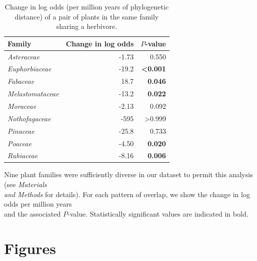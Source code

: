 \documentclass[12pt]{article}
\begin{document}
  \begin{table}[!h]
  \caption{\small Change in log odds (per million years of phylogenetic distance) of a pair of plants in the same family sharing a herbivore.}
  \label{family_slopes_ph}
  \begin{tabular}{|l  rr|}
  \hline
    Family & Change in log odds & $P$-value \\
    \hline
    \emph{Asteraceae} & -1.73 &  0.550 \\
    \emph{Euphorbiaceae} & -19.2 & \textbf{\textless0.001} \\
    \emph{Fabaceae} & 18.7 &  \textbf{0.046} \\
    \emph{Melastomataceae} & -13.2 & \textbf{0.022} \\
    \emph{Moraceae} & -2.13 & 0.092 \\
    \emph{Nothofagaceae} & -595 & \textgreater{0.999} \\
    \emph{Pinaceae} &  -25.8 & 0.733 \\
    \emph{Poaceae} & -4.50 & \textbf{0.020} \\
    \emph{Rubiaceae} & -8.16 &  \textbf{0.006} \\
  \hline
  \end{tabular}
  \smallskip
  \footnotesize

  Nine plant families were sufficiently diverse in our  dataset to permit this analysis
  (see \emph{Materials \\and Methods} for details). For each pattern of overlap, we show the change
  in log odds per million years \\and the associated $P$-value. Statistically significant values are
  indicated in bold. \\

  \end{table}

\clearpage


\section*{Figures}
\end{document}
